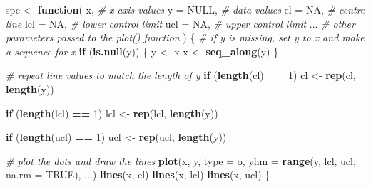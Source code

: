 \documentclass[
]{book}
\newenvironment{Shaded}{\begin{snugshade}}{\end{snugshade}}
\newcommand{\AttributeTok}[1]{\textcolor[rgb]{0.13,0.29,0.53}{#1}}
\newcommand{\CommentTok}[1]{\textcolor[rgb]{0.56,0.35,0.01}{\textit{#1}}}
\newcommand{\ConstantTok}[1]{\textcolor[rgb]{0.56,0.35,0.01}{#1}}
\newcommand{\ControlFlowTok}[1]{\textcolor[rgb]{0.13,0.29,0.53}{\textbf{#1}}}
\newcommand{\DecValTok}[1]{\textcolor[rgb]{0.00,0.00,0.81}{#1}}
\newcommand{\FunctionTok}[1]{\textcolor[rgb]{0.13,0.29,0.53}{\textbf{#1}}}
\newcommand{\NormalTok}[1]{#1}
\newcommand{\OtherTok}[1]{\textcolor[rgb]{0.56,0.35,0.01}{#1}}
\newcommand{\SpecialCharTok}[1]{\textcolor[rgb]{0.81,0.36,0.00}{\textbf{#1}}}
\newcommand{\StringTok}[1]{\textcolor[rgb]{0.31,0.60,0.02}{#1}}
\begin{document}
\begin{Shaded}
\begin{Highlighting}[]
\NormalTok{spc }\OtherTok{\textless{}{-}} \ControlFlowTok{function}\NormalTok{(}
\NormalTok{    x,           }\CommentTok{\# x axis values}
    \AttributeTok{y   =} \ConstantTok{NULL}\NormalTok{,  }\CommentTok{\# data values}
    \AttributeTok{cl  =} \ConstantTok{NA}\NormalTok{,    }\CommentTok{\# centre line}
    \AttributeTok{lcl =} \ConstantTok{NA}\NormalTok{,    }\CommentTok{\# lower control limit}
    \AttributeTok{ucl =} \ConstantTok{NA}\NormalTok{,    }\CommentTok{\# upper control limit}
\NormalTok{    ...          }\CommentTok{\# other parameters passed to the plot() function}
\NormalTok{) \{}
  \CommentTok{\# if y is missing, set y to x and make a sequence for x}
  \ControlFlowTok{if}\NormalTok{ (}\FunctionTok{is.null}\NormalTok{(y)) \{}
\NormalTok{    y }\OtherTok{\textless{}{-}}\NormalTok{ x}
\NormalTok{    x }\OtherTok{\textless{}{-}} \FunctionTok{seq\_along}\NormalTok{(y)}
\NormalTok{  \}}
  
  \CommentTok{\# repeat line values to match the length of y}
  \ControlFlowTok{if}\NormalTok{ (}\FunctionTok{length}\NormalTok{(cl) }\SpecialCharTok{==} \DecValTok{1}\NormalTok{)}
\NormalTok{    cl }\OtherTok{\textless{}{-}} \FunctionTok{rep}\NormalTok{(cl, }\FunctionTok{length}\NormalTok{(y))}
  
  \ControlFlowTok{if}\NormalTok{ (}\FunctionTok{length}\NormalTok{(lcl) }\SpecialCharTok{==} \DecValTok{1}\NormalTok{)}
\NormalTok{    lcl }\OtherTok{\textless{}{-}} \FunctionTok{rep}\NormalTok{(lcl, }\FunctionTok{length}\NormalTok{(y))}
  
  \ControlFlowTok{if}\NormalTok{ (}\FunctionTok{length}\NormalTok{(ucl) }\SpecialCharTok{==} \DecValTok{1}\NormalTok{)}
\NormalTok{    ucl }\OtherTok{\textless{}{-}} \FunctionTok{rep}\NormalTok{(ucl, }\FunctionTok{length}\NormalTok{(y))}
  
  \CommentTok{\# plot the dots and draw the lines}
  \FunctionTok{plot}\NormalTok{(x, y, }
       \AttributeTok{type =} \StringTok{\textquotesingle{}o\textquotesingle{}}\NormalTok{,}
       \AttributeTok{ylim =} \FunctionTok{range}\NormalTok{(y, lcl, ucl, }\AttributeTok{na.rm =} \ConstantTok{TRUE}\NormalTok{),}
\NormalTok{       ...)}
  \FunctionTok{lines}\NormalTok{(x, cl)}
  \FunctionTok{lines}\NormalTok{(x, lcl)}
  \FunctionTok{lines}\NormalTok{(x, ucl)}
\NormalTok{\}}
\end{Highlighting}
\end{Shaded}
\end{document}
